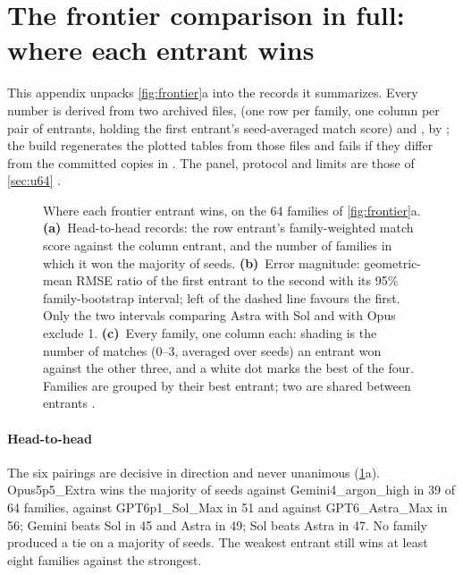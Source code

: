 \section{The frontier comparison in full: where each entrant wins}
\label{app:frontier}

This appendix unpacks \cref{fig:frontier}a into the records it summarizes. Every number is derived
from two archived files,  (one row per family, one column
per pair of entrants, holding the first entrant's seed-averaged match score) and
, by ; the build regenerates
the plotted tables from those files and fails if they differ from the committed copies in
. The panel, protocol and limits are those of \cref{sec:u64} \pre.

\begin{figure}[h]
\centering

\caption{Where each frontier entrant wins, on the 64 families of \cref{fig:frontier}a.
\textbf{(a)}~Head-to-head records: the row entrant's family-weighted match score against the column
entrant, and the number of families in which it won the majority of seeds.
\textbf{(b)}~Error magnitude: geometric-mean RMSE ratio of the first entrant to the second with its
95\% family-bootstrap interval; left of the dashed line favours the first. Only the two intervals
comparing Astra with Sol and with Opus exclude 1. \textbf{(c)}~Every family, one column each: shading is the number of
matches (0--3, averaged over seeds) an entrant won against the other three, and a white dot marks the
best of the four. Families are grouped by their best entrant; two are shared between entrants \pre.}
\label{fig:frontier-wins}
\end{figure}

\paragraph{Head-to-head} The six pairings are decisive in direction and never unanimous
(\cref{fig:frontier-wins}a). Opus5p5\_Extra wins the majority of seeds against Gemini4\_argon\_high
in 39 of 64 families, against GPT6p1\_Sol\_Max in 51 and against GPT6\_Astra\_Max in 56;
Gemini beats Sol in 45 and Astra in 49; Sol beats Astra in 47. No family produced a tie on a
majority of seeds. The weakest entrant still wins at least eight families against the strongest.

